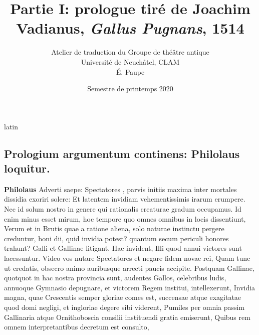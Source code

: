 \documentclass[12pt]{book}
\renewenvironment{latin}
    	{\begin{hyphenrules}{latin}}
    	{\end{hyphenrules}}
\begin{document}
        \title{Partie I: prologue tiré de Joachim Vadianus, \textit{Gallus Pugnans}, 1514}
        \author{Atelier de traduction du Groupe de théâtre antique\\
            Université de Neuchâtel, CLAM\\
            É. Paupe}
        \date{Semestre de printemps 2020}
        
        \maketitle
        \begin{pages}
        \begin{latin}
        \begin{Leftside}
        \beginnumbering 
            \pstart\section*{Prologium argumentum continens: Philolaus loquitur.}\pend\pstart\textbf{Philolaus }\hspace{1cm} Adverti saepe:  
                    Spectatores , parvis initiis maxima inter mortales dissidia exoriri solere: 
            Et latentem invidiam vehementissimis irarum  erumpere. 
            Nec id solum nostro in genere qui rationalis creaturae gradum occupamus.  
            Id enim minus esset mirum, hoc  tempore quo omnes omnibus in locis dissentiunt, 
            Verum et in Brutis quae a ratione aliena, solo naturae instinctu pergere creduntur, boni dii, quid invidia potest?  
            quantum secum periculi honores trahunt?  
            Galli et Gallinae litigant.  
            Hae invident, Illi quod annui victores sunt lacessuntur.  
            Video vos nutare Spectatores et negare fidem novae rei, 
            Quam tunc ut credatis, obsecro animo auribusque arrecti paucis accipite.  
            Postquam Gallinae, quotquot in hac nostra provincia sunt, audentes Gallos, celebribus ludis, annuoque Gymnasio depugnare, et victorem Regem institui, intellexerunt, 
            Invidia magna, quae Crescentis semper gloriae comes est, 
            succensae atque exagitatae quod domi negligi, 
            et ingloriae degere sibi viderent, 
            Pumiles  per omnia passim Gallinaria atque Ornithoboscia consilii instituendi gratia emiserunt, 
            Quibus rem omnem interpretantibus decretum est consulto, 

\end{Leftside}
\end{latin}
\end{pages}
\end{document}
